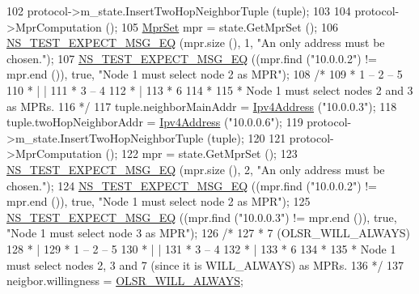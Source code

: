 \begin{DoxyCode}
102   protocol->m\_state.InsertTwoHopNeighborTuple (tuple);
103 
104   protocol->MprComputation ();
105   \hyperlink{namespacens3_1_1olsr_aa7c4ede0ba85f0ea9da6e6699525bd4a}{MprSet} mpr = state.GetMprSet ();
106   \hyperlink{group__testing_ga7304ba46a28d8cf08dfdfd6499cf7068}{NS\_TEST\_EXPECT\_MSG\_EQ} (mpr.size (), 1, \textcolor{stringliteral}{"An only address must be chosen."});
107   \hyperlink{group__testing_ga7304ba46a28d8cf08dfdfd6499cf7068}{NS\_TEST\_EXPECT\_MSG\_EQ} ((mpr.find (\textcolor{stringliteral}{"10.0.0.2"}) != mpr.end ()), \textcolor{keyword}{true}, \textcolor{stringliteral}{"Node 1 must
       select node 2 as MPR"});
108   \textcolor{comment}{/*}
109 \textcolor{comment}{   *  1 -- 2 -- 5}
110 \textcolor{comment}{   *  |    |}
111 \textcolor{comment}{   *  3 -- 4}
112 \textcolor{comment}{   *  |}
113 \textcolor{comment}{   *  6}
114 \textcolor{comment}{   *}
115 \textcolor{comment}{   * Node 1 must select nodes 2 and 3 as MPRs.}
116 \textcolor{comment}{   */}
117   tuple.neighborMainAddr = \hyperlink{classns3_1_1Ipv4Address}{Ipv4Address} (\textcolor{stringliteral}{"10.0.0.3"});
118   tuple.twoHopNeighborAddr = \hyperlink{classns3_1_1Ipv4Address}{Ipv4Address} (\textcolor{stringliteral}{"10.0.0.6"});
119   protocol->m\_state.InsertTwoHopNeighborTuple (tuple);
120 
121   protocol->MprComputation ();
122   mpr = state.GetMprSet ();
123   \hyperlink{group__testing_ga7304ba46a28d8cf08dfdfd6499cf7068}{NS\_TEST\_EXPECT\_MSG\_EQ} (mpr.size (), 2, \textcolor{stringliteral}{"An only address must be chosen."});
124   \hyperlink{group__testing_ga7304ba46a28d8cf08dfdfd6499cf7068}{NS\_TEST\_EXPECT\_MSG\_EQ} ((mpr.find (\textcolor{stringliteral}{"10.0.0.2"}) != mpr.end ()), \textcolor{keyword}{true}, \textcolor{stringliteral}{"Node 1 must
       select node 2 as MPR"});
125   \hyperlink{group__testing_ga7304ba46a28d8cf08dfdfd6499cf7068}{NS\_TEST\_EXPECT\_MSG\_EQ} ((mpr.find (\textcolor{stringliteral}{"10.0.0.3"}) != mpr.end ()), \textcolor{keyword}{true}, \textcolor{stringliteral}{"Node 1 must
       select node 3 as MPR"});
126   \textcolor{comment}{/*}
127 \textcolor{comment}{   *  7 (OLSR\_WILL\_ALWAYS)}
128 \textcolor{comment}{   *  |}
129 \textcolor{comment}{   *  1 -- 2 -- 5}
130 \textcolor{comment}{   *  |    |}
131 \textcolor{comment}{   *  3 -- 4}
132 \textcolor{comment}{   *  |}
133 \textcolor{comment}{   *  6}
134 \textcolor{comment}{   *}
135 \textcolor{comment}{   * Node 1 must select nodes 2, 3 and 7 (since it is WILL\_ALWAYS) as MPRs.}
136 \textcolor{comment}{   */}
137   neigbor.willingness = \hyperlink{olsr-routing-protocol-test-suite_8cc_a47254d140ed26351d672c338a8cda435}{OLSR\_WILL\_ALWAYS};

\end{DoxyCode}

